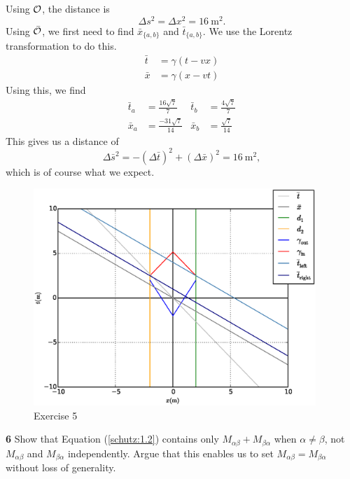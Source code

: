 \documentclass[gr-notes.tex]{subfiles}
\begin{document}
Using $\mathcal{O}$, the distance is
%
\begin{displaymath}
\Delta s^2 = \Delta x^2 = \SI{16}{\meter^2}.
\end{displaymath}
%
Using $\bar{\mathcal{O}}$, we first need to find $\bar{x}_{\{a,b\}}$ and $\bar{t}_{\{a,b\}}$. We use the Lorentz transformation to do this.
%
\begin{align*}
  \bar{t} &= \gamma (t - vx)
  \\
  \bar{x} &= \gamma (x - vt)
\end{align*}
%
Using this, we find
\begin{align*}
  \bar{t}_a &= \frac{16 \sqrt7}{7} &
  \bar{t}_b &= \frac{4 \sqrt7}{7}
  \\
  \bar{x}_a &= \frac{-31 \sqrt7}{14} &
  \bar{x}_b &= \frac{\sqrt7}{14}
\end{align*}
%
This gives us a distance of
%
\begin{displaymath}
  \Delta \bar{s}^2 = -(\Delta \bar{t})^2 + (\Delta \bar{x})^2 = \SI{16}{\meter^2},
\end{displaymath}
%
which is of course what we expect.

\begin{figure}[h]
  \centering
  \includegraphics[width=0.95\textwidth]{img/problem_5}

  \caption*{Exercise 5}
\end{figure}


\textbf{6}
Show that Equation (\ref{schutz:1.2}) contains only $M_{\alpha\beta} + M_{\beta\alpha}$ when $\alpha \neq \beta$, not $M_{\alpha\beta}$ and $M_{\beta\alpha}$ independently. Argue that this enables us to set $M_{\alpha\beta} = M_{\beta\alpha}$ without loss of generality.
\end{document}
